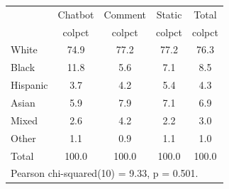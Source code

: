 {
\def\sym#1{\ifmmode^{#1}\else\(^{#1}\)\fi}
\begin{tabular}{l*{4}{c}}
\toprule
                    &     Chatbot&     Comment&      Static&       Total\\
                    &      colpct&      colpct&      colpct&      colpct\\
\midrule
White               &        74.9&        77.2&        77.2&        76.3\\
Black               &        11.8&         5.6&         7.1&         8.5\\
Hispanic            &         3.7&         4.2&         5.4&         4.3\\
Asian               &         5.9&         7.9&         7.1&         6.9\\
Mixed               &         2.6&         4.2&         2.2&         3.0\\
Other               &         1.1&         0.9&         1.1&         1.0\\
Total               &       100.0&       100.0&       100.0&       100.0\\
\bottomrule
\multicolumn{5}{l}{\footnotesize Pearson chi-squared(10) = 9.33, p = 0.501.}\\
\end{tabular}
}
